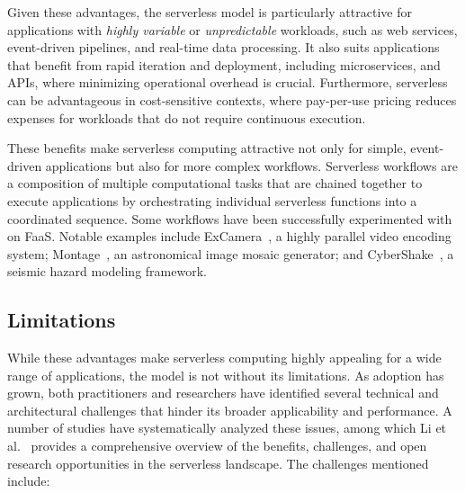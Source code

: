Given these advantages, the serverless model is particularly attractive for applications with \textit{highly variable} or \textit{unpredictable} workloads, such as web services, event-driven pipelines, and real-time data processing. It also suits applications that benefit from rapid iteration and deployment, including microservices, and APIs, where minimizing operational overhead is crucial. Furthermore, serverless can be advantageous in cost-sensitive contexts, where pay-per-use pricing reduces expenses for workloads that do not require continuous execution.

These benefits make serverless computing attractive not only for simple, event-driven applications but also for more complex workflows. Serverless workflows are a composition of multiple computational tasks that are chained together to execute applications by orchestrating individual serverless functions into a coordinated sequence. Some workflows have been successfully experimented with on FaaS. Notable examples include ExCamera~\cite{excamera}, a highly parallel video encoding system; Montage~\cite{montage_astronomy}, an astronomical image mosaic generator; and CyberShake~\cite{cybershake_workflow}, a seismic hazard modeling framework.

\subsection{Limitations}
While these advantages make serverless computing highly appealing for a wide range of applications, the model is not without its limitations. As adoption has grown, both practitioners and researchers have identified several technical and architectural challenges that hinder its broader applicability and performance. A number of studies have systematically analyzed these issues, among which Li et al.~\cite{serverless_computing_survey_rw1} provides a comprehensive overview of the benefits, challenges, and open research opportunities in the serverless landscape. The challenges mentioned include:

